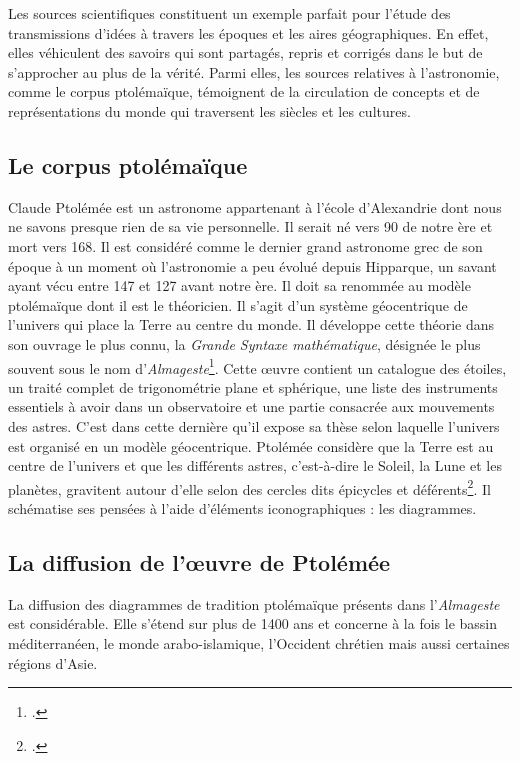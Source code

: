 Les sources scientifiques constituent un exemple parfait pour l'étude des transmissions d'idées à travers les époques et les aires géographiques. En effet, elles véhiculent des savoirs qui sont partagés, repris et corrigés dans le but de s'approcher au plus de la vérité. 
Parmi elles, les sources relatives à l'astronomie, comme le corpus ptolémaïque, témoignent de la circulation de concepts et de représentations du monde qui traversent les siècles et les cultures.

\subsection{Le corpus ptolémaïque}
Claude Ptolémée est un astronome appartenant à l'école d'Alexandrie dont nous ne
savons presque rien de sa vie personnelle. Il serait né vers 90 de notre ère et mort vers 168. Il est considéré comme le dernier grand astronome grec de son époque à un 
moment où l'astronomie a peu évolué depuis Hipparque, un savant ayant vécu entre 147 et 127 avant notre ère. Il doit sa renommée au modèle ptolémaïque dont il est le théoricien. Il s'agit d'un système géocentrique de l'univers qui place la Terre au centre du monde. Il développe cette théorie dans son ouvrage le plus connu, la \textit{Grande Syntaxe mathématique}, désignée le plus souvent sous le nom d'\textit{Almageste}\footcite{verdetLaubeLastronomieLaurore1990}. 
Cette œuvre contient un catalogue des étoiles, un traité complet de trigonométrie plane et sphérique, une liste des instruments essentiels à avoir dans un observatoire et une partie consacrée aux mouvements des astres. C'est dans cette dernière qu'il expose sa thèse selon laquelle l'univers est organisé en un modèle géocentrique. Ptolémée considère que la Terre est au centre de l'univers et que les différents astres, c'est-à-dire le Soleil, la Lune et les planètes, gravitent autour d'elle selon des cercles dits épicycles et déférents\footcite{costabelCLAUDEPTOLEMEE90}. Il schématise ses pensées à l'aide d'éléments iconographiques : les diagrammes. 

\subsection{La diffusion de l'œuvre de Ptolémée}
La diffusion des diagrammes de tradition ptolémaïque présents dans l'\textit{Almageste} est considérable. Elle s'étend sur plus de 1400 ans et concerne à la fois le bassin méditerranéen, le monde arabo-islamique, l'Occident chrétien mais aussi certaines régions d'Asie. 

